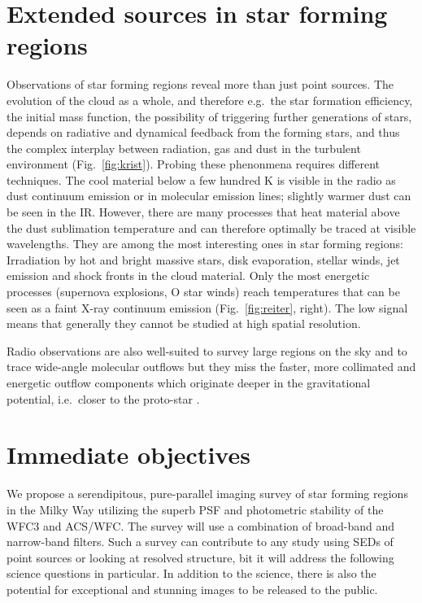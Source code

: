 \documentclass[12pt]{article}
\begin{document}
\section{Extended sources in star forming regions}
Observations of star forming regions reveal more than just point sources. The evolution of the
cloud as a whole, and therefore e.g.\ the star formation efficiency, the initial mass function, the possibility of triggering further generations of stars, depends on radiative and dynamical feedback from the forming stars, and thus the complex interplay between radiation, gas and dust in the turbulent environment (Fig.~\ref{fig:krist}). Probing these phenonmena requires different techniques. The
cool material below a few hundred K is visible in the radio as dust continuum
emission or in molecular emission lines; slightly warmer dust can be seen in
the IR. However, there are many processes that heat material above the dust
sublimation temperature and can therefore optimally be traced at visible wavelengths. 
They are among the most interesting ones in star forming regions:
Irradiation by hot and bright massive stars, disk evaporation, stellar winds,
jet emission and shock fronts in the cloud material. Only the most energetic
processes (supernova explosions, O star winds) reach temperatures that can be seen as a faint
X-ray continuum emission (Fig.~\ref{fig:reiter}, right). The low signal means that generally they 
cannot be studied at high spatial resolution.

Radio observations are also well-suited to survey large regions on the sky and to
trace wide-angle molecular outflows \citep[e.g.][]{2003MNRAS.341..707C} but
they miss the faster, more collimated and energetic outflow components which originate
deeper in the gravitational potential, i.e.\ closer to the proto-star
\citep{2003ApJ...590L.107A}.


\section{Immediate objectives}
We propose a serendipitous, pure-parallel imaging survey of star forming regions in the Milky Way utilizing the superb PSF and photometric stability of the WFC3 and ACS/WFC. The survey will use a combination of broad-band and narrow-band filters. Such a survey can contribute to any study using SEDs of point sources or looking at resolved structure, bit it will address the following science questions in particular.
In addition to the science, there is also the potential for exceptional and stunning images to be released to the public.
\end{document}
